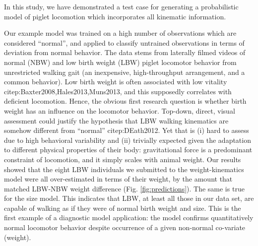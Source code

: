 \bigskip
In this study, we have demonstrated a test case for generating a probabilistic model of piglet locomotion which incorporates all kinematic information.

Our example model was trained on a high number of observations which are considered ``normal'', and applied to classify untrained observations in terms of deviation from normal behavior.
The data stems from laterally filmed videos of normal (NBW) and low birth weight (LBW) piglet locomotor behavior from unrestricted walking gait (an inexpensive, high-throughput arrangement, and a common behavior).
Low birth weight is often associated with low vitality citep:Baxter2008,Hales2013,Muns2013, and this supposedly correlates with deficient locomotion.
Hence, the obvious first research question is whether birth weight has an influence on the locomotor behavior.
Top-down, direct, visual assessment could justify the hypothesis that LBW walking kinematics are somehow different from ``normal'' citep:DEath2012.
Yet that is (i) hard to assess due to high behavioral variability and (ii) trivially expected given the adaptation to different physical properties of their body: gravitational force is a predominant constraint of locomotion, and it simply scales with animal weight.
Our results showed that the eight LBW individuals we submitted to the weight-kinematics model were all over-estimated in terms of their weight, by the amount that matched LBW-NBW weight difference (Fig. \ref{fig:predictions}).
The same is true for the size model.
This indicates that LBW, at least all those in our data set, are capable of walking as if they were of normal birth weight and size.
This is the first example of a diagnostic model application: the model confirms quantitatively normal locomotor behavior despite occurrence of a given non-normal co-variate (weight).

